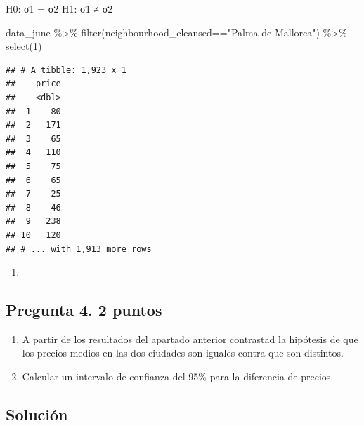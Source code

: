 \documentclass[
]{article}
\newenvironment{Shaded}{\begin{snugshade}}{\end{snugshade}}
\newcommand{\DecValTok}[1]{\textcolor[rgb]{0.00,0.00,0.81}{#1}}
\newcommand{\DocumentationTok}[1]{\textcolor[rgb]{0.56,0.35,0.01}{\textbf{\textit{#1}}}}
\newcommand{\FunctionTok}[1]{\textcolor[rgb]{0.00,0.00,0.00}{#1}}
\newcommand{\NormalTok}[1]{#1}
\newcommand{\SpecialCharTok}[1]{\textcolor[rgb]{0.00,0.00,0.00}{#1}}
\newcommand{\StringTok}[1]{\textcolor[rgb]{0.31,0.60,0.02}{#1}}
\providecommand{\tightlist}{%
  \setlength{\itemsep}{0pt}\setlength{\parskip}{0pt}}
\begin{document}
H0: σ1 = σ2 H1: σ1 ≠ σ2

\begin{Shaded}
\begin{Highlighting}[]
\NormalTok{data\_june }\SpecialCharTok{\%\textgreater{}\%}
  \FunctionTok{filter}\NormalTok{(neighbourhood\_cleansed}\SpecialCharTok{==}\StringTok{"Palma de Mallorca"}\NormalTok{) }\SpecialCharTok{\%\textgreater{}\%}
  \FunctionTok{select}\NormalTok{(}\DecValTok{1}\NormalTok{)}
\end{Highlighting}
\end{Shaded}

\begin{verbatim}
## # A tibble: 1,923 x 1
##    price
##    <dbl>
##  1    80
##  2   171
##  3    65
##  4   110
##  5    75
##  6    65
##  7    25
##  8    46
##  9   238
## 10   120
## # ... with 1,913 more rows
\end{verbatim}

\begin{Shaded}
\end{Shaded}

\begin{enumerate}
\def\labelenumi{\alph{enumi})}
\setcounter{enumi}{1}
\tightlist
\item
\end{enumerate}

\hypertarget{pregunta-4.-2-puntos}{%
\subsection{\texorpdfstring{Pregunta 4. \textbf{2
puntos}}{Pregunta 4. 2 puntos}}\label{pregunta-4.-2-puntos}}

\begin{enumerate}
\def\labelenumi{\alph{enumi}.}
\tightlist
\item
  A partir de los resultados del apartado anterior contrastad la
  hipótesis de que los precios medios en las dos ciudades son iguales
  contra que son distintos.
\item
  Calcular un intervalo de confianza del 95\% para la diferencia de
  precios.
\end{enumerate}

\hypertarget{soluciuxf3n-3}{%
\subsection{Solución}\label{soluciuxf3n-3}}
\end{document}
